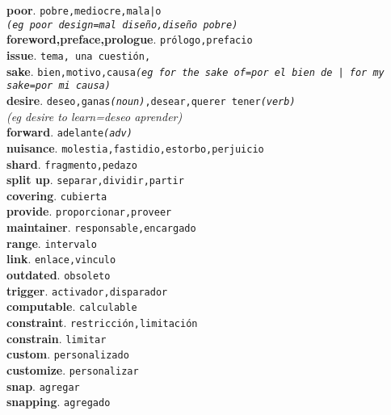 \documentclass[twocolumn]{article}
\begin{document}
	\textsf{\textbf{poor}}. \texttt{pobre,mediocre,mala|o\\{\scriptsize \textsl{(eg poor design=mal dise\~no,dise\~no pobre)}}}\\
	\textsf{\textbf{foreword,preface,prologue}}. \texttt{pr\'ologo,prefacio}\\
	\textsf{\textbf{issue}}. \texttt{tema, una cuesti\'on,}\\
	\textsf{\textbf{sake}}. \texttt{bien,motivo,causa{\scriptsize \textsl{(eg for the sake of=por el bien de | for my sake=por mi causa)}}}\\
	\textsf{\textbf{desire}}. \texttt{deseo,ganas{\scriptsize \textsl{(noun)}},desear,querer tener{\scriptsize \textsl{(verb)}}}\\{\scriptsize \textsl{(eg desire to learn=deseo aprender)}}\\
	\textsf{\textbf{forward}}. \texttt{adelante{\scriptsize \textsl{(adv)}}}\\
	\textsf{\textbf{nuisance}}. \texttt{molestia,fastidio,estorbo,perjuicio}\\
	\textsf{\textbf{shard}}. \texttt{fragmento,pedazo}\\
	\textsf{\textbf{split up}}. \texttt{separar,dividir,partir}\\
	\textsf{\textbf{covering}}. \texttt{cubierta}\\
	\textsf{\textbf{provide}}. \texttt{proporcionar,proveer}\\
	\textsf{\textbf{maintainer}}. \texttt{responsable,encargado}\\
	\textsf{\textbf{range}}. \texttt{intervalo}\\
	\textsf{\textbf{link}}. \texttt{enlace,vinculo}\\
	\textsf{\textbf{outdated}}. \texttt{obsoleto}\\
	\textsf{\textbf{trigger}}. \texttt{activador,disparador}\\
	\textsf{\textbf{computable}}. \texttt{calculable}\\
	\textsf{\textbf{constraint}}. \texttt{restricci\'on,limitaci\'on}\\
	\textsf{\textbf{constrain}}. \texttt{limitar}\\
	\textsf{\textbf{custom}}. \texttt{personalizado}\\
	\textsf{\textbf{customize}}. \texttt{personalizar}\\
	\textsf{\textbf{snap}}. \texttt{agregar}\\
	\textsf{\textbf{snapping}}. \texttt{agregado}\\
\end{document}
